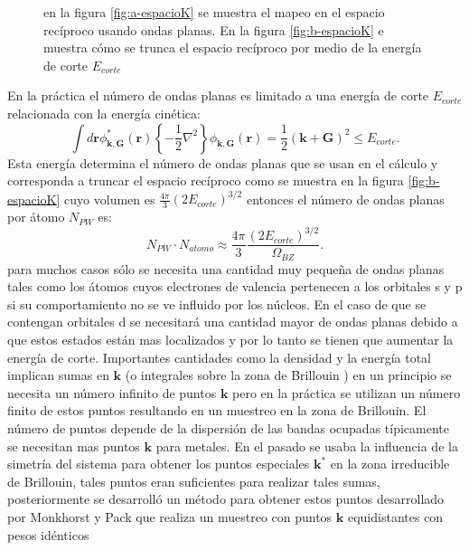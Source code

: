 \documentclass[12pt,a4paper, oneside]{book}
\begin{document}
   \begin{figure}[!htb]
   	\centering
   \caption{en la figura \ref{fig:a-espacioK} se muestra el mapeo en el espacio rec\'iproco usando ondas planas. En la figura \ref{fig:b-espacioK} e muestra c\'omo  se trunca el espacio rec\'iproco por medio de la energ\'ia de corte $E_{corte} $}
   \label{fig:espacioK}
   \end{figure}
   En la pr\'actica el n\'umero de ondas planas es limitado a una energ\'ia de corte $E_{corte}$ relacionada con la energ\'ia cin\'etica:
   \begin{equation}
   \int d \pmb{r}  \phi_{\pmb{k},\pmb{G}}^* (\pmb{r}) \left\{-\frac{1}{2} \nabla^2 \right\} \phi_{\pmb{k},\pmb{G}} (\pmb{r}) = \frac{1}{2} (\pmb{k}+ \pmb{G})^2 \le E_{corte}. \label{ec:Ecut}
   \end{equation}
   Esta energ\'ia determina el n\'umero de ondas planas que se usan en el c\'alculo y corresponda a truncar el espacio rec\'iproco como se muestra en la figura \ref{fig:b-espacioK} cuyo volumen es $\frac{4 \pi }{3} (2 E_{corte})^{3/2}$ entonces el n\'umero de ondas planas por \'atomo $N_{PW}$ es:
   \begin{equation}
   N_{PW}\cdot N_{atomo} \approx \frac{4 \pi }{3} \frac{(2E_{corte})^{3/2}}{\Omega_{BZ}}. \label{ec:NumAtomoPW}
   \end{equation}
   para muchos casos s\'olo se necesita una cantidad muy peque\~na de ondas planas tales como los \'atomos cuyos electrones de valencia pertenecen a los orbitales s y p si su comportamiento no se ve influido por los n\'ucleos. En el caso de que se contengan orbitales d se necesitar\'a una cantidad mayor de ondas planas debido a que estos estados est\'an mas localizados y por lo tanto se tienen que aumentar la energ\'ia de corte.
   \newline
   Importantes cantidades como la densidad y la energ\'ia total implican sumas en $\pmb{k}$ (o integrales sobre la zona de Brillouin ) en un principio se necesita un n\'umero infinito de puntos $\pmb{k}$ pero en la pr\'actica se utilizan un n\'umero finito de estos puntos resultando en un muestreo en la zona de Brillouin. El n\'umero de puntos depende de la dispersi\'on de las bandas ocupadas t\'ipicamente se necesitan mas puntos $\pmb{k}$ para metales. En el pasado se usaba la influencia de la simetr\'ia del sistema para obtener los puntos especiales $\pmb{k}^*$ en la zona irreducible de Brillouin, tales puntos eran suficientes para realizar tales sumas, posteriormente se desarroll\'o   un m\'etodo para obtener estos puntos desarrollado por Monkhorst y Pack que realiza un muestreo con puntos $\pmb{k}$ equidistantes con pesos id\'enticos
\end{document}
